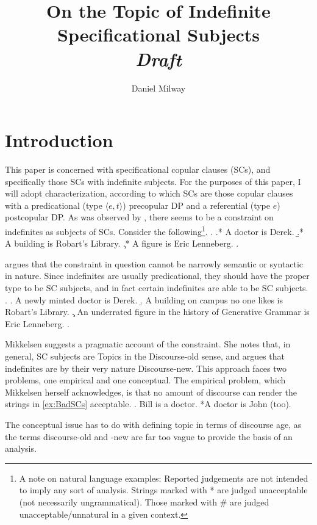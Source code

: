 \documentclass[letterpaper]{article}
\title{On the Topic of Indefinite Specificational Subjects\\\textit{Draft}}
\author{Daniel Milway}
\begin{document}
\maketitle
\section{Introduction}
This paper is concerned with specificational copular clauses (SCs), and specifically those SCs with indefinite subjects.
For the purposes of this paper, I will adopt  characterization, according to which SCs are those copular clauses with a predicational (type $\langle e,t\rangle$) precopular DP and a referential (type $e$) postcopular DP.
As was observed by \textcite{higgins1973pseudo}, there  seems to be a constraint on indefinites as subjects of SCs.
Consider the following\footnote{
	A note on natural language examples:
	Reported judgements are not intended to imply any sort of analysis.
	Strings marked with * are judged unacceptable (not necessarily ungrammatical).
	Those marked with \# are judged unacceptable/unnatural in a given context.
}.
\ex.\label{ex:BadSCs}
\a.* A doctor is Derek.
\b.* A building is Robart's Library.
\c.* A figure is Eric Lenneberg. 
\z.

\textcite{mikkelsen2004specifying} argues that the constraint in question cannot be narrowly semantic or syntactic in nature.
Since indefinites are usually predicational, they should have the proper type to be SC subjects, and in fact certain indefinites are able to be SC subjects.
\ex.\label{ex:GoodSCs}
\a. A newly minted doctor is Derek.
\b. A building on campus no one likes is Robart's Library.
\c. An underrated figure in the history of Generative Grammar is Eric Lenneberg.
\z.

Mikkelsen suggests a pragmatic account of the constraint.
She notes that, in general, SC subjects are Topics in the Discourse-old sense, and argues that indefinites are by their very nature Discourse-new.
This approach faces two problems, one empirical and one conceptual.
The empirical problem, which Mikkelsen herself acknowledges, is that no amount of discourse can render the strings in \ref{ex:BadSCs} acceptable.
\ex. Bill is a doctor. *A doctor is John (too). \hfill \parencite[Adapted from][p. 236]{mikkelsen2004specifying}

The conceptual issue has to do with defining topic in terms of discourse age, as the terms discourse-old and -new are far too vague to provide the basis of an analysis.
\end{document}
